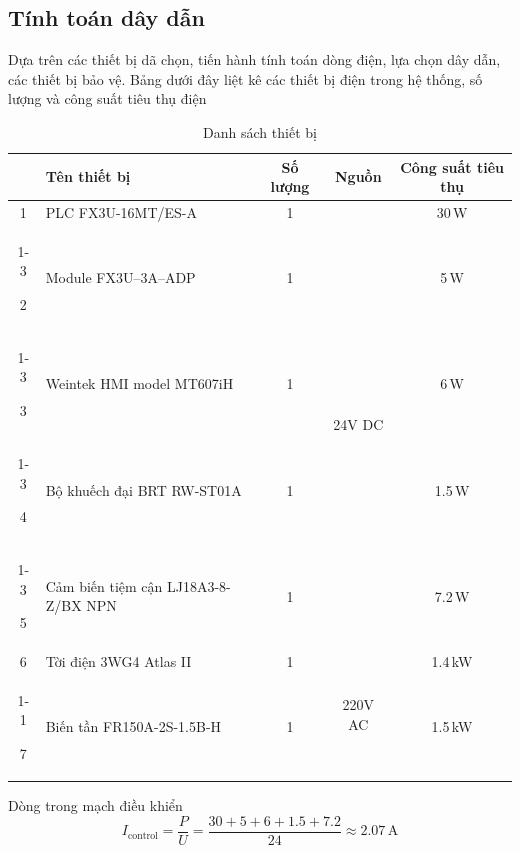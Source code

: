           \subsection{Tính toán dây dẫn}
          \hspace*{0.6cm}Dựa trên các thiết bị dã chọn, tiến hành tính toán dòng điện, lựa chọn dây dẫn, các thiết bị bảo vệ. Bảng dưới đây liệt kê các thiết bị điện trong hệ thống, số lượng và công suất tiêu thụ điện
          \begin{table}[h!]
               \caption{Danh sách thiết bị}
               \label{tab:device_list}
               \centering
               \begin{tabular}{|c|l|c|c|c|}
               \hline
               \textbf{} & \centering\textbf{Tên thiết bị} & \textbf{Số lượng} & \textbf{Nguồn} & \textbf{Công suất tiêu thụ} \\ \hline

               1 & PLC FX3U-16MT/ES-A & 1 & \multirow{5}{*}{24V DC} & 30\,W \\ \cline{1-3}\cline{5-5}

               2 & Module FX3U–3A–ADP & 1 &  & 5\,W \\ \cline{1-3}\cline{5-5}

               3 & Weintek HMI model MT607iH & 1 &  & 6\,W \\ \cline{1-3}\cline{5-5}

               4 & Bộ khuếch đại BRT RW-ST01A & 1 &  & 1.5\,W \\ \cline{1-3}\cline{5-5}

               5 & Cảm biến tiệm cận LJ18A3-8-Z/BX NPN & 1 &  & 7.2\,W \\ \hline

               6 & Tời điện 3WG4 Atlas II 
               & 1 & \multirow{2}{*}{220V AC} & 1.4\,kW \\ \cline{1-1}\cline{2-3}\cline{5-5}

               7 & Biến tần FR150A-2S-1.5B-H & 1 &  & 1.5\,kW \\ \hline
               \end{tabular}
          \end{table}
          \hspace*{0.6cm}Dòng trong mạch điều khiển
          \begin{equation}
               I_{\text{control}} = \dfrac{P}{U} = \dfrac{30 + 5 + 6 + 1.5 + 7.2}{24} \approx 2.07 \,\mathrm{A}
               \label{c4_eq01}
          \end{equation}
